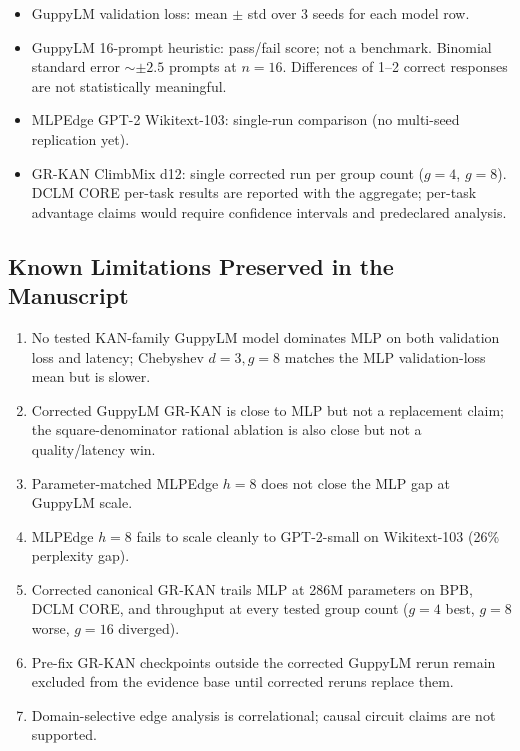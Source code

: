 \documentclass{article}
\begin{document}
\begin{itemize}
  \item GuppyLM validation loss: mean $\pm$ std over 3 seeds for each model row.
  \item GuppyLM 16-prompt heuristic: pass/fail score; not a benchmark.
    Binomial standard error ${\sim}\pm2.5$ prompts at $n=16$.
    Differences of 1--2 correct responses are not statistically meaningful.
  \item MLPEdge GPT-2 Wikitext-103: single-run comparison (no multi-seed replication yet).
  \item GR-KAN ClimbMix d12: single corrected run per group count ($g=4$, $g=8$).
    DCLM CORE per-task results are reported with the aggregate; per-task
    advantage claims would require confidence intervals and predeclared analysis.
\end{itemize}

\subsection{Known Limitations Preserved in the Manuscript}

\begin{enumerate}
  \item No tested KAN-family GuppyLM model dominates MLP on both validation loss and latency; Chebyshev $d=3,g=8$ matches the MLP validation-loss mean but is slower.
  \item Corrected GuppyLM GR-KAN is close to MLP but not a replacement claim; the square-denominator rational ablation is also close but not a quality/latency win.
  \item Parameter-matched MLPEdge $h=8$ does not close the MLP gap at GuppyLM scale.
  \item MLPEdge $h=8$ fails to scale cleanly to GPT-2-small on Wikitext-103 (26\% perplexity gap).
  \item Corrected canonical GR-KAN trails MLP at 286M parameters on BPB, DCLM CORE, and throughput at every tested group count ($g=4$ best, $g=8$ worse, $g=16$ diverged).
  \item Pre-fix GR-KAN checkpoints outside the corrected GuppyLM rerun remain excluded from the evidence base until corrected reruns replace them.
  \item Domain-selective edge analysis is correlational; causal circuit claims are not supported.
\end{enumerate}
\end{document}
